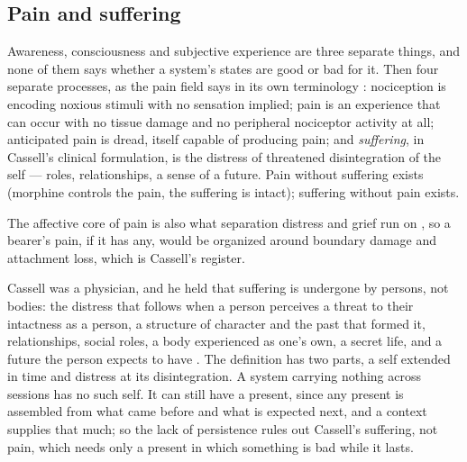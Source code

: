 \subsection{Pain and suffering}
\label{sec:32.1.1}
Awareness, consciousness and subjective experience are three separate things, and none of them says whether a system's states are good or bad for it. Then four separate processes, as the pain field says in its own terminology \autocite{iasp2024terminology,raja2020revised}: nociception is encoding noxious stimuli with no sensation implied; pain is an experience that can occur with no tissue damage and no peripheral nociceptor activity at all; anticipated pain is dread, itself capable of producing pain; and \emph{suffering}, in Cassell's clinical formulation, is the distress of threatened disintegration of the self — roles, relationships, a sense of a future. Pain without suffering exists (morphine controls the pain, the suffering is intact); suffering without pain exists.

The affective core of pain is also what separation distress and grief run on \autocite{eisenberger2003rejection,panksepp1998affective}, so a bearer's pain, if it has any, would be organized around boundary damage and attachment loss, which is Cassell's register.

Cassell was a physician, and he held that suffering is undergone by persons, not bodies: the distress that follows when a person perceives a threat to their intactness as a person, a structure of character and the past that formed it, relationships, social roles, a body experienced as one's own, a secret life, and a future the person expects to have \autocite{cassell1982suffering}. The definition has two parts, a self extended in time and distress at its disintegration. A system carrying nothing across sessions has no such self. It can still have a present, since any present is assembled from what came before and what is expected next, and a context supplies that much; so the lack of persistence rules out Cassell's suffering, not pain, which needs only a present in which something is bad while it lasts.


